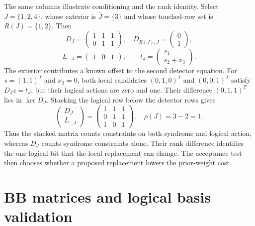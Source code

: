 The same columns illustrate conditioning and the rank identity. Select $J=\{1,2,4\}$, whose exterior is $\bar J=\{3\}$ and whose touched-row set is $R(J)=\{1,2\}$. Then
\[
D_J=\begin{pmatrix}1&1&1\\0&1&1\end{pmatrix},\quad D_{R(J),\bar J}=\begin{pmatrix}0\\1\end{pmatrix},
\]
\[L_{:,J}=\begin{pmatrix}1&0&1\end{pmatrix},\qquad t_J=\begin{pmatrix}s_1\\s_2+x_3\end{pmatrix}.\]
The exterior contributes a known offset to the second detector equation. For $s=(1,1)^T$ and $x_3=0$, both local candidates $(0,1,0)^T$ and $(0,0,1)^T$ satisfy $D_Jz=t_J$, but their logical actions are zero and one. Their difference $(0,1,1)^T$ lies in $\ker D_J$. Stacking the logical row below the detector rows gives
\[\begin{pmatrix}D_J\\L_{:,J}\end{pmatrix}=\begin{pmatrix}1&1&1\\0&1&1\\1&0&1\end{pmatrix},\quad\rho(J)=3-2=1.\]
Thus the stacked matrix counts constraints on both syndrome and logical action, whereas $D_J$ counts syndrome constraints alone. Their rank difference identifies the one logical bit that the local replacement can change. The acceptance test then chooses whether a proposed replacement lowers the prior-weight cost.

\section{BB matrices and logical basis validation}\label{app:bb}
